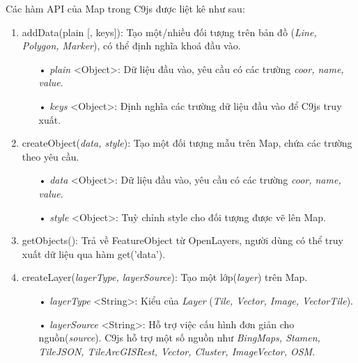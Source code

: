 \documentclass[12pt,a4paper]{article}
\begin{document}
Các hàm API của Map trong C9js được liệt kê như sau:
\begin{enumerate}
\item \textsf{addData(plain [, keys])}: Tạo một/nhiều đối tượng trên bản đồ (\textit{Line, Polygon, Marker}), có thể định nghĩa khoá đầu vào.
	\begin{itemize}
		\item[•] \textit{plain} <Object>: Dữ liệu đầu vào, yêu cầu có các trường \textit{coor, name, value}.
		\item[•] \textit{keys} <Object>: Định nghĩa các trường dữ liệu đầu vào để C9js truy xuất.
	\end{itemize}
	
\item \textsf{createObject(\textit{data, style})}: Tạo một đối tượng mẫu trên Map, chứa các trường theo yêu cầu.
	\begin{itemize}
		\item[•] \textit{data} <Object>: Dữ liệu đầu vào, yêu cầu có các trường \textit{coor, name, value}.
		\item[•] \textit{style} <Object>: Tuỳ chỉnh style cho đối tượng được vẽ lên Map.
	\end{itemize}
	
\item \textsf{getObjects()}: Trả về FeatureObject từ OpenLayers, người dùng có thể truy xuất dữ liệu qua hàm \textsf{get('data')}.

\item \textsf{createLayer(\textit{layerType, layerSource})}: Tạo một lớp(\textit{layer}) trên Map.
	\begin{itemize}
		\item[•] \textit{layerType} <String>: Kiểu của \textit{Layer} (\textit{Tile, Vector, Image, VectorTile}).
		\item[•] \textit{layerSource} <String>: Hỗ trợ việc cấu hình đơn giản cho nguồn(\textit{source}). C9js hỗ trợ một số nguồn như \textit{BingMaps, Stamen, TileJSON, TileArcGISRest, Vector, Cluster, ImageVector, OSM}.
	\end{itemize}


\end{enumerate}
\end{document}
